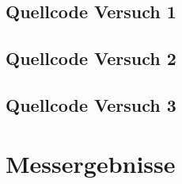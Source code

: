 \documentclass[12pt, oneside, a4paper, \docLanguage]{report}
\begin{document}
\subsection{Quellcode Versuch 1}
\label{chap:APPENDIX_SOURCECODE_V1}


\subsection{Quellcode Versuch 2}
\label{chap:APPENDIX_SOURCECODE_V2}


\subsection{Quellcode Versuch 3}
\label{chap:APPENDIX_SOURCECODE_V3}



\section{Messergebnisse}
\label{chap:APPENDIX_MEASUREMENT_SOURCE}

%
%

\end{document}
